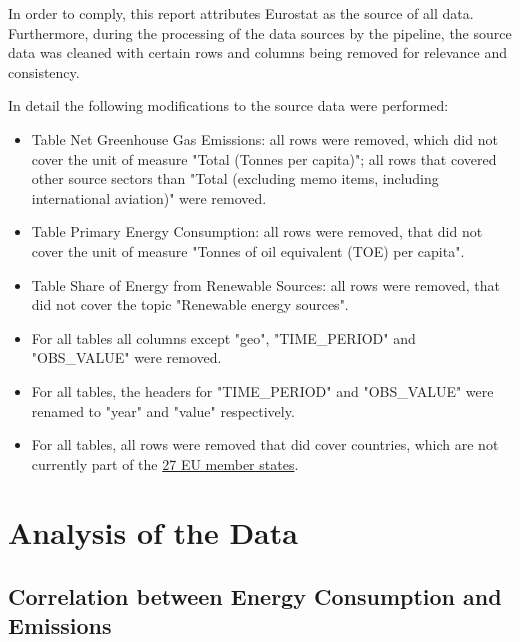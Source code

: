 \documentclass{article}
\begin{document}
In order to comply, this report attributes Eurostat as the source of all data.
Furthermore, during the processing of the data sources by the pipeline, the source data was cleaned with certain
rows and columns being removed for relevance and consistency.

In detail the following modifications to the source data were performed:
\begin{itemize}
    \item Table Net Greenhouse Gas Emissions: all rows were removed, which did not cover the unit of measure "Total (Tonnes per capita)";
    all rows that covered other source sectors than "Total (excluding memo items, including international aviation)" were removed.
    \item Table Primary Energy Consumption: all rows were removed, that did not cover the unit of measure "Tonnes of oil equivalent (TOE) per capita".
    \item Table Share of Energy from Renewable Sources: all rows were removed, that did not cover the topic "Renewable energy sources".
    \item For all tables all columns except "geo", "TIME\_PERIOD" and "OBS\_VALUE" were removed.
    \item For all tables, the headers for "TIME\_PERIOD" and "OBS\_VALUE" were renamed to "year" and "value" respectively.
    \item For all tables, all rows were removed that did cover countries, which are not currently part of the \href{https://www.destatis.de/Europa/EN/Country/Country-Codes.html}{27 EU member states}.
\end{itemize}

\section*{Analysis of the Data}
\subsection*{Correlation between Energy Consumption and Emissions}
\end{document}
